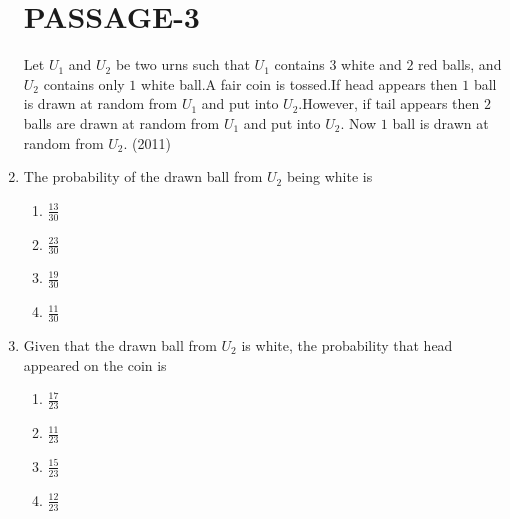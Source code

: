 \documentclass[journal,12pt,onecolumn,article]{IEEEtran}
\theoremstyle{remark}
\begin{document}
\begin{enumerate}
		 \section*{PASSAGE-3}
Let $U_1$ and $U_2$ be two urns such that $U_1$ contains $3$ white and $2$ red balls, and $U_2$ contains only $1$ white ball.A fair coin is tossed.If head appears then $1$ ball is drawn at random from $U_1$ and put into $U_2$.However, if tail appears then $2$ balls are drawn at random from $U_1$ and put into $U_2$. Now $1$ ball is drawn at random from $U_2$. \hfill(2011)
         \item The probability of the drawn ball from $U_2$ being white is
		 \begin{enumerate}
				 \item $\frac{13}{30}$
				 \item $\frac{23}{30}$
				 \item $\frac{19}{30}$
				 \item $\frac{11}{30}$
		 \end{enumerate}
	 \item Given that the drawn ball from $U_2$ is white, the probability that head appeared on the coin is 
		 \begin{enumerate}
				 \item $\frac{17}{23}$
				 \item $\frac{11}{23}$
				 \item $\frac{15}{23}$
				 \item $\frac{12}{23}$
		 \end{enumerate}
\end{enumerate}
\end{document}
